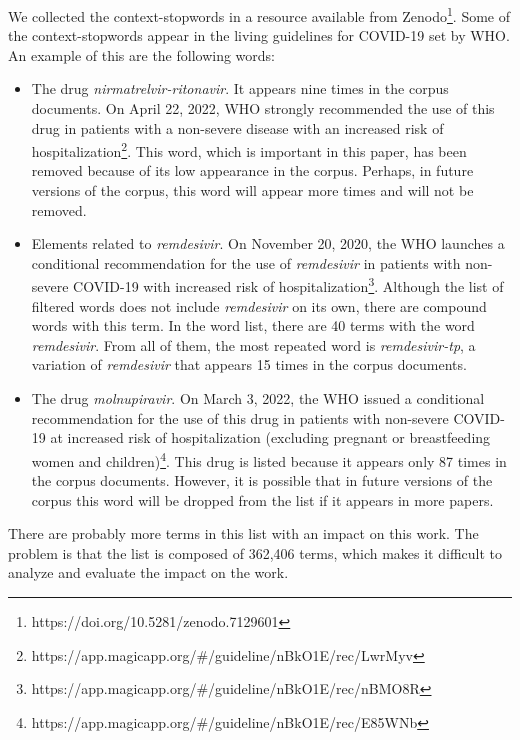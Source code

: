 \documentclass[a4paper,10pt]{article}
\begin{document}
We collected the context-stopwords in a resource available from Zenodo\footnote{https://doi.org/10.5281/zenodo.7129601}. Some of the context-stopwords appear in the living guidelines for COVID-19 set by WHO. An example of this are the following words:

\begin{itemize}
    \item The drug \textit{nirmatrelvir-ritonavir}. It appears nine times in the corpus documents. On April 22, 2022, WHO strongly recommended the use of this drug in patients with a non-severe disease with an increased risk of hospitalization\footnote{https://app.magicapp.org/\#/guideline/nBkO1E/rec/LwrMyv}. This word, which is important in this paper, has been removed because of its low appearance in the corpus. Perhaps, in future versions of the corpus, this word will appear more times and will not be removed.


    \item Elements related to \textit{remdesivir}. On November 20, 2020, the WHO launches a conditional recommendation for the use of \textit{remdesivir} in patients with non-severe COVID-19 with increased risk of hospitalization\footnote{https://app.magicapp.org/\#/guideline/nBkO1E/rec/nBMO8R}. Although the list of filtered words does not include \textit{remdesivir} on its own, there are compound words with this term. In the word list, there are 40 terms with the word \textit{remdesivir}. From all of them, the most repeated word is \textit{remdesivir-tp}, a variation of \textit{remdesivir} that appears 15 times in the corpus documents.

    \item The drug \textit{molnupiravir}. On March 3, 2022, the WHO issued a conditional recommendation for the use of this drug in patients with non-severe COVID-19 at increased risk of hospitalization (excluding pregnant or breastfeeding women and children)\footnote{https://app.magicapp.org/\#/guideline/nBkO1E/rec/E85WNb}. This drug is listed because it appears only 87 times in the corpus documents. However, it is possible that in future versions of the corpus this word will be dropped from the list if it appears in more papers.

\end{itemize}

There are probably more terms in this list with an impact on this work. The problem is that the list is composed of 362,406 terms, which makes it difficult to analyze and evaluate the impact on the work.
\newpage
\end{document}
